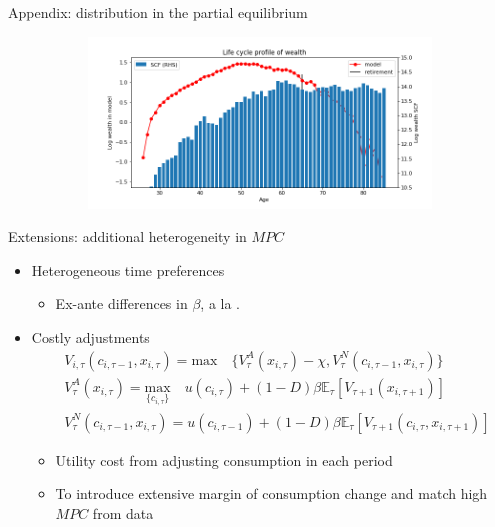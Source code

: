 \documentclass{beamer}
\begin{document}
\begin{frame}{Appendix: distribution in the partial equilibrium}
\begin{figure}[ht]
\begin{subfigure}[b]{0.6\textwidth}
			\includegraphics[width=\textwidth]{figures/life_cycle_a_test.png}
		\end{subfigure} 
	\end{figure}
	\hyperlink{objectivemodelresults}{} 
\end{frame}



\begin{frame}{Extensions: additional heterogeneity in $MPC$}
	
	\begin{itemize}
		\item Heterogeneous time preferences
		\begin{itemize}
			\item Ex-ante differences in $\beta$, a la \cite{krusell1998income,carroll2017distribution,krueger2016macroeconomics}.
		\end{itemize}
		\item Costly adjustments
		\begin{equation*}
			\begin{split}
				& V_{i,\tau}(c_{i,\tau-1},x_{i,\tau}) = \textrm{max} \quad \{V^A_{\tau}(x_{i,\tau})-\chi,V^N_{\tau}(c_{i,\tau-1},x_{i,\tau})\} \\
				& V^A_{\tau}(x_{i,\tau}) = \underset{\{c_{i,\tau}\}}{\textrm{max}} \quad u(c_{i,\tau}) + (1-D)\beta \mathbb{E}_{\tau}\left[V_{\tau+1}(x_{i,\tau+1})\right]  \\
				& V^N_{\tau}(c_{i,\tau-1},x_{i,\tau}) =  u(c_{i,\tau-1}) + (1-D)\beta \mathbb{E}_{\tau}\left[V_{\tau+1}(c_{i,\tau},x_{i,\tau+1})\right]
			\end{split}
		\end{equation*}
		\begin{itemize}
			\item Utility cost from adjusting consumption in each period
			\item To introduce extensive margin of consumption change and match high $MPC$ from data 
		\end{itemize}
	\end{itemize}
\end{frame}




\end{document}
